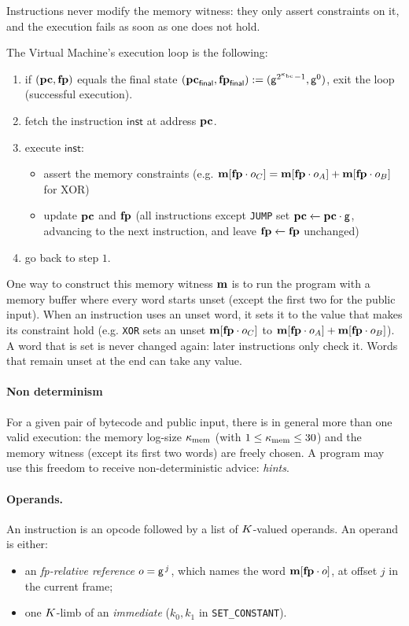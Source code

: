 Instructions never modify the memory witness: they only assert constraints on it, and the execution fails as soon as one does not hold.

\vspace{5mm}

The Virtual Machine's execution loop is the following:
\begin{enumerate}
  \item if $(\mathbf{pc},\mathbf{fp})$ equals the final state $(\mathbf{pc}_{\textsf{final}},\mathbf{fp}_{\textsf{final}}) := (\mathsf{g}^{2^{\kappa_{\mathrm{bc}}}-1},\mathsf{g}^{0})$, exit the loop (successful execution).
  \item fetch the instruction $\mathsf{inst}$ at address $\mathbf{pc}$.
  \item execute $\mathsf{inst}$:
    \begin{itemize}
      \item assert the memory constraints (e.g. $\mathbf{m}[\mathbf{fp}\cdot o_C]=\mathbf{m}[\mathbf{fp}\cdot o_A]+\mathbf{m}[\mathbf{fp}\cdot o_B]$ for XOR)
      \item update $\mathbf{pc}$ and $\mathbf{fp}$ (all instructions except \texttt{JUMP} set $\mathbf{pc} \xleftarrow{} \mathbf{pc} \cdot \mathsf{g}$, advancing to the next instruction, and leave $\mathbf{fp} \xleftarrow{} \mathbf{fp}$ unchanged)
    \end{itemize}
  \item go back to step $1.$
\end{enumerate}

One way to construct this memory witness $\mathbf{m}$ is to run the program with a memory buffer where every word starts unset (except the first two for the public input). When an instruction uses an unset word, it sets it to the value that makes its constraint hold (e.g. \texttt{XOR} sets an unset $\mathbf{m}[\mathbf{fp}\cdot o_C]$ to $\mathbf{m}[\mathbf{fp}\cdot o_A]+\mathbf{m}[\mathbf{fp}\cdot o_B]$). A word that is set is never changed again: later instructions only check it. Words that remain unset at the end can take any value.

\paragraph{Non determinism}

For a given pair of bytecode and public input, there is in general more than one valid execution: the memory log-size $\kappa_{\mathrm{mem}}$ (with $1\le\kappa_{\mathrm{mem}}\le 30$) and the memory witness (except its first two words) are freely chosen. A program may use this freedom to receive non-deterministic advice: \emph{hints}.

\paragraph{Operands.} An instruction is an opcode followed by a list of $K$-valued operands. An operand is either:
\begin{itemize}
  \item an \emph{fp-relative reference} $o=\mathsf{g}^{\,j}$, which names the word $\mathbf{m}[\mathbf{fp}\cdot o]$, at offset $j$ in the current frame;
  \item one $K$-limb of an \emph{immediate} ($k_0,k_1$ in \texttt{SET\_CONSTANT}).
\end{itemize}


